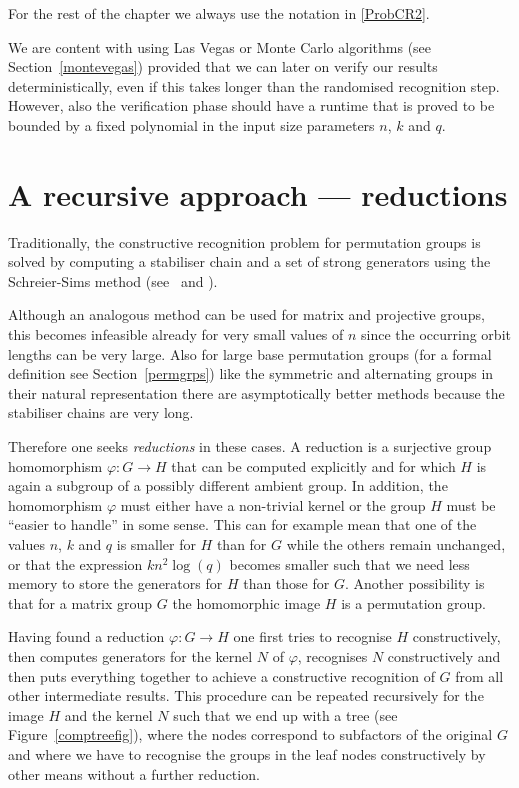 For the rest of the chapter we always use the notation in \ref{ProbCR2}.

\smallskip
\begin{Rem}
We are content with using Las Vegas or Monte Carlo algorithms (see
Section~\ref{montevegas}) provided that we can later on verify our results
deterministically, even if this takes longer than the randomised
recognition step. However, also the verification phase should have a
runtime that is proved to be bounded by a fixed polynomial in the input
size parameters $n$, $k$ and $q$.
\end{Rem}

\section{A recursive approach --- reductions}
\label{recapproach}

Traditionally, the constructive recognition problem for permutation
groups is solved by computing a stabiliser chain and a set of strong
generators using the Schreier-Sims method (see~\cite{Si} and \cite{Ser}). 

Although an analogous method can be used for matrix and projective groups,
this becomes infeasible already for very small values of $n$ since the
occurring orbit lengths can be very large. Also for large base permutation
groups (for a formal definition see Section~\ref{permgrps}) like the
symmetric and alternating groups in their natural representation there
are asymptotically better methods because the stabiliser chains are very long.

Therefore one seeks \emph{reductions} in these cases. A reduction is
a surjective group homomorphism $\varphi : G \to H$ that can be computed
explicitly and for which $H$ is again a subgroup of a possibly different
ambient group. In addition, the homomorphism $\varphi$ must either have
a non-trivial kernel or the group $H$ must be ``easier to handle'' in some
sense. This can for example mean that one of the values $n$, $k$ and
$q$ is smaller for $H$ than for $G$ while the others remain unchanged,
or that the expression $kn^2\log(q)$ becomes smaller such that we need
less memory to store the generators for $H$ than those for $G$.
Another possibility is that for a matrix group $G$ the homomorphic image
$H$ is a permutation group.

Having found a reduction $\varphi : G \to H$ one first tries to recognise
$H$ constructively, then computes generators for the kernel $N$ of
$\varphi$, recognises $N$ constructively and then puts everything together
to achieve a constructive recognition of $G$ from all other intermediate
results. This procedure can be repeated recursively for the image $H$ and
the kernel $N$ such that we end up with a tree (see
Figure~\ref{comptreefig}), where the nodes correspond
to subfactors of the original $G$ and where we have to recognise
the groups in the leaf nodes constructively by other means without
a further reduction.


